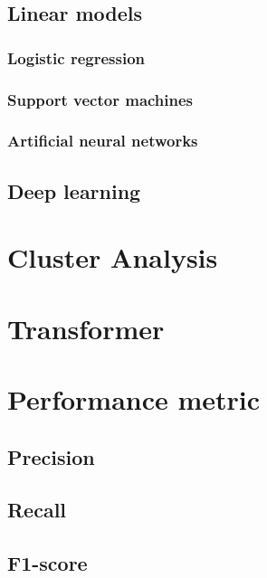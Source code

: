 \subsection{Linear models}
\label{sec:linear-models}

\subsubsection{Logistic regression}
\label{sec:logistic-regression}

\subsubsection{Support vector machines}
\label{sec:support-vector-machines}

\subsubsection{Artificial neural networks}
\label{sec:artificial-neural-networks}

\subsection{Deep learning}
\label{sec:deep-learning}


\section{Cluster Analysis}
\label{sec:cluster-analysis}


\section{Transformer}
\label{sec:transformer}


\section{Performance metric}
\label{sec:performance-metric}

\subsection{Precision}
\label{sec:precision}

\subsection{Recall}
\label{sec:recall}

\subsection{F1-score}
\label{sec:f1-score}

